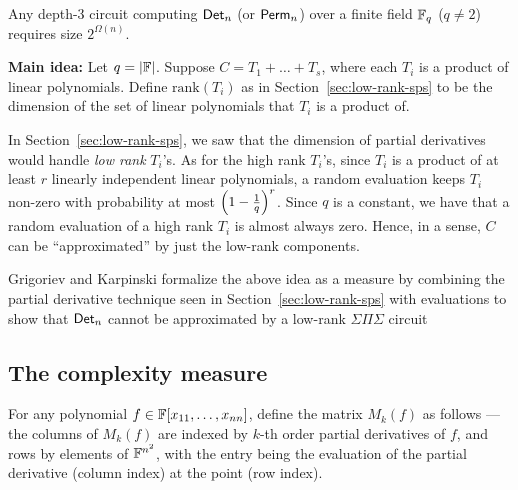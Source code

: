 \documentclass{birkjour}
\newcommand{\SPS}{\Sigma\Pi\Sigma}
\providecommand{\DIFaddtex}[1]{{\protect\color{blue}\uwave{#1}}} %
\providecommand{\DIFaddbegin}{} %
\providecommand{\DIFaddend}{} %
\providecommand{\DIFadd}[1]{\texorpdfstring{\DIFaddtex{#1}}{#1}} %
\begin{document}
\begin{theorem}\cite{grigoriev98}\label{thm:gk-main-thm}
  Any depth-3 circuit computing $\mathsf{Det}_n$ (or $\mathsf{Perm}_n$) over a finite field $\mathbb{F}_q$ ($q\neq 2$)
  requires size $2^{\Omega(n)}$.
\end{theorem}

{\bf Main idea:} Let $q = |\mathbb{F}|$. Suppose $C = T_1 + \dots + T_s$,
where each $T_i$ is a product of linear polynomials. Define
$\mathrm{rank}(T_i)$ as in Section~\ref{sec:low-rank-sps} to be the
dimension of the set of linear polynomials that $T_i$ is a product
of. 

In Section~\ref{sec:low-rank-sps}, we saw that the dimension of partial
derivatives would handle \emph{low rank} $T_i$'s. As for the high rank $T_i$'s, since $T_i$ is a product of at least $r$ linearly independent linear polynomials, a random evaluation keeps $T_i$ non-zero with probability at most $\left(1-\frac{1}{q}\right)^r$. Since $q$ is a constant, we have that a random evaluation of a high rank $T_i$ is almost always zero. Hence, in a sense, $C$ can be
``approximated'' by just the low-rank components. 


Grigoriev and Karpinski \cite{grigoriev98} formalize the above idea as
a measure by combining the partial derivative technique seen in Section~\ref{sec:low-rank-sps} with evaluations  to show that $\mathsf{Det}_n$ cannot be
approximated by a low-rank $\SPS$ circuit\DIFaddbegin \DIFadd{.
}\DIFaddend 

\subsection{The complexity measure}

For any polynomial $f \in \mathbb{F}[x_{11},\dots, x_{nn}]$, define the matrix
$M_k(f)$ as follows --- the columns of $M_k(f)$ are indexed by $k$-th
order partial derivatives of $f$, and rows by elements of $\mathbb{F}^{n^2}$,
with the entry being the evaluation of the partial derivative (column
index) at the point (row index).\\
\end{document}
